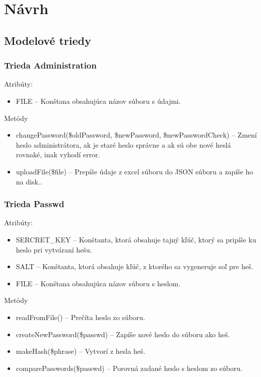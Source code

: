 \documentclass[12pt,a4paper]{report}
\begin{document}
\renewcommand{\chaptername}{}	
\chapter[Návrh]{\rmfamily\bfseries
	Návrh}

\section[Modelové triedy]{\rmfamily\bfseries
	Modelové triedy}

\subsection[Trieda Administration]{\rmfamily\bfseries
	Trieda Administration}
Atribúty:
\begin{itemize}
		\item FILE – Konštana obsahujúca názov súboru s údajmi. 
\end{itemize}
Metódy
\begin{itemize}
	\item changePassword(\$oldPassword, \$newPassword, \$newPasswordCheck) – Zmení heslo administrátora, ak je staré heslo správne a ak sú obe nové heslá rovnaké, inak vyhodí error.
	\item uploadFile(\$file) – Prepíše údaje z excel súboru do JSON súboru a zapíše ho na disk..
\end{itemize}

\subsection[Trieda Passwd]{\rmfamily\bfseries
	Trieda Passwd}
Atribúty:
\begin{itemize}
	\item SERCRET\_KEY – Konštanta, ktorá obsahuje tajný kľúč, ktorý sa pripíše ku heslo pri vytváraní hešu. 
	\item SALT – Konštanta, ktorá obsahuje kľúč, z ktorého sa vygeneruje soľ pre heš.
	\item FILE – Konštana obsahujúca názov súboru s heslom.
\end{itemize}
Metódy
\begin{itemize}
	\item readFromFile() – Prečíta heslo zo súboru.
	\item createNewPassword(\$passwd) – Zapíše nové heslo do súboru ako heš.
	\item makeHash(\$phrase) – Vytvorí z hesla heš.
	\item comparePasswords(\$passwd) – Porovná zadané heslo s heslom zo súboru.
\end{itemize}
\end{document}
